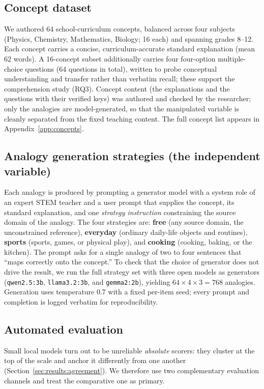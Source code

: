 \documentclass[11pt]{article}
\newcommand{\result}[1]{#1}  %
\begin{document}
\subsection{Concept dataset}
\label{sec:method:concepts}
We authored \result{64} school-curriculum concepts, balanced across four subjects
(Physics, Chemistry, Mathematics, Biology; \result{16} each) and spanning grades
8--12. Each concept carries a concise, curriculum-accurate standard explanation
(mean \result{62} words). A \result{16}-concept subset additionally carries four
four-option multiple-choice questions ($\result{64}$ questions in total),
written to probe conceptual understanding and transfer rather than verbatim
recall; these support the comprehension study (RQ3). Concept content (the
explanations and the questions with their verified keys) was authored and checked
by the researcher; only the analogies are model-generated, so that the
manipulated variable is cleanly separated from the fixed teaching content. The
full concept list appears in Appendix~\ref{app:concepts}.

\subsection{Analogy generation strategies (the independent variable)}
\label{sec:method:generation}
Each analogy is produced by prompting a generator model with a system role of an
expert STEM teacher and a user prompt that supplies the concept, its standard
explanation, and one \emph{strategy instruction} constraining the source domain
of the analogy. The four strategies are: \textbf{free} (any source domain, the
unconstrained reference), \textbf{everyday} (ordinary daily-life objects and
routines), \textbf{sports} (sports, games, or physical play), and
\textbf{cooking} (cooking, baking, or the kitchen). The prompt asks for a single
analogy of two to four sentences that ``maps correctly onto the concept.'' To
check that the choice of generator does not drive the result, we run the full strategy set with
three open models as generators (\texttt{qwen2.5:3b}, \texttt{llama3.2:3b}, and
\texttt{gemma2:2b}), yielding $\result{64}\times4\times3=\result{768}$ analogies.
Generation uses temperature 0.7 with a fixed per-item seed; every prompt and
completion is logged verbatim for reproducibility.

\subsection{Automated evaluation}
\label{sec:method:eval}
Small local models turn out to be unreliable \emph{absolute} scorers: they cluster
at the top of the scale and anchor it differently from one another
(Section~\ref{sec:results:agreement}). We therefore use two complementary
evaluation channels and treat the comparative one as primary.
\end{document}
